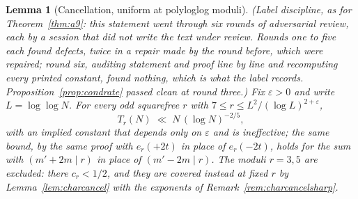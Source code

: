 \documentclass[11pt]{article}
\newtheorem{lemma}[theorem]{Lemma}
\theoremstyle{definition}
\begin{document}
\begin{lemma}[Cancellation, uniform at polyloglog moduli]\label{lem:charcancelunif}
\textup{(Label discipline, as for Theorem~\ref{thm:a9}: this statement went through six rounds of
adversarial review, each by a session that did not write the text under review. Rounds one to five
each found defects, twice in a repair made by the round before, which were repaired; round
six, auditing statement and proof line by line and recomputing every printed constant, found
nothing, which is what the label records. Proposition~\ref{prop:condrate} passed clean at round
three.)}
Fix $\varepsilon>0$ and write $L=\log\log N$. For every odd squarefree $r$ with
$7\le r\le L^2/(\log L)^{2+\varepsilon}$,
\[ T_r(N)\;\ll\;N\,(\log N)^{-2/5}, \]
with an implied constant that depends only on $\varepsilon$ and is ineffective; the same bound, by the
same proof with $e_r(+2t)$ in place of $e_r(-2t)$, holds for the sum with $(m'+2m\mid r)$ in place
of $(m'-2m\mid r)$. The moduli $r=3,5$ are excluded: there $c_r<1/2$, and they are
covered instead at fixed $r$ by Lemma~\ref{lem:charcancel} with the exponents of
Remark~\ref{rem:charcancelsharp}.
\end{lemma}
\end{document}

